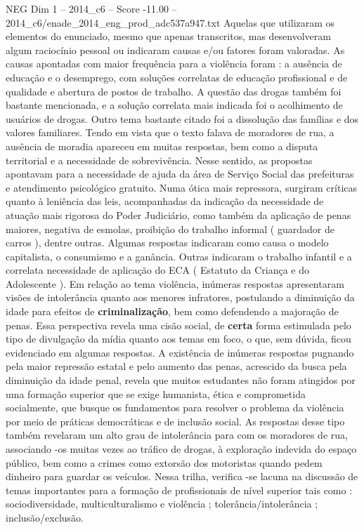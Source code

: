\begin{textsample}{NEG Dim 1 – 2014\_c6 – Score -11.00 – 2014\_c6/enade\_2014\_eng\_prod\_adc537a947.txt}
Aquelas que utilizaram os elementos do enunciado, mesmo que apenas transcritos, mas desenvolveram algum raciocínio pessoal ou indicaram causas e/ou fatores foram valoradas.
As causas apontadas com maior frequência para a violência foram : a ausência de educação e o desemprego, com soluções correlatas de educação profissional e de qualidade e abertura de postos de trabalho.
A questão das drogas também foi bastante mencionada, e a solução correlata mais indicada foi o acolhimento de usuários de drogas.
Outro tema bastante citado foi a dissolução das famílias e dos valores familiares.
Tendo em vista que o texto falava de moradores de rua, a ausência de moradia apareceu em muitas respostas, bem como a disputa territorial e a necessidade de sobrevivência.
Nesse sentido, as propostas apontavam para a necessidade de ajuda da área de Serviço Social das prefeituras e atendimento psicológico gratuito.
Numa ótica mais repressora, surgiram críticas quanto à leniência das leis, acompanhadas da indicação da necessidade de atuação mais rigorosa do Poder Judiciário, como também da aplicação de penas maiores, negativa de esmolas, proibição do trabalho informal ( guardador de carros ), dentre outras.
Algumas respostas indicaram como causa o modelo capitalista, o consumismo e a ganância.
Outras indicaram o trabalho infantil e a correlata necessidade de aplicação do ECA ( Estatuto da Criança e do Adolescente ).
Em relação ao tema violência, inúmeras respostas apresentaram visões de intolerância quanto aos menores infratores, postulando a diminuição da idade para efeitos de \textbf{criminalização}, bem como defendendo a majoração de penas.
Essa perspectiva revela uma cisão social, de \textbf{certa} forma estimulada pelo tipo de divulgação da mídia quanto aos temas em foco, o que, sem dúvida, ficou evidenciado em algumas respostas.
A existência de inúmeras respostas pugnando pela maior repressão estatal e pelo aumento das penas, acrescido da busca pela diminuição da idade penal, revela que muitos estudantes não foram atingidos por uma formação superior que se exige humanista, ética e comprometida socialmente, que busque os fundamentos para resolver o problema da violência por meio de práticas democráticas e de inclusão social.
As respostas desse tipo também revelaram um alto grau de intolerância para com os moradores de rua, associando -os muitas vezes ao tráfico de drogas, à exploração indevida do espaço público, bem como a crimes como extorsão dos motoristas quando pedem dinheiro para guardar os veículos.
Nessa trilha, verifica -se lacuna na discussão de temas importantes para a formação de profissionais de nível superior tais como : sociodiversidade, multiculturalismo e violência ; tolerância/intolerância ; inclusão/exclusão.

\end{textsample}
